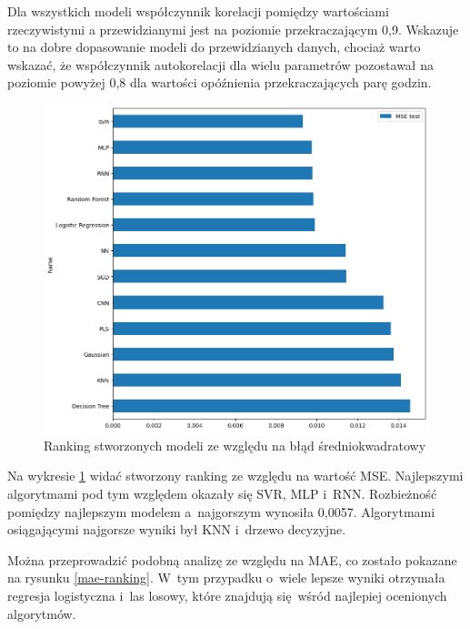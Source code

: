 Dla wszystkich modeli współczynnik korelacji pomiędzy wartościami rzeczywistymi 
a przewidzianymi jest na poziomie przekraczającym 0,9. Wskazuje to na dobre dopasowanie
modeli do przewidzianych danych, chociaż warto wskazać, że współczynnik
autokorelacji dla wielu parametrów pozostawał na poziomie powyżej 0,8 dla wartości
opóźnienia przekraczających parę godzin.

\begin{figure}[H]
    \centering
    \includegraphics[width=\textwidth]{images/mse_ranking.png}
    \caption{Ranking stworzonych modeli ze względu na błąd średniokwadratowy}
    \label{mse-ranking}
\end{figure}

Na wykresie \ref{mse-ranking} widać stworzony ranking ze względu na wartość MSE.
Najlepszymi algorytmami pod tym względem okazały się SVR, MLP i~RNN. Rozbieżność 
pomiędzy najlepszym modelem a~najgorszym wynosiła 0,0057. Algorytmami 
osiągającymi najgorsze wyniki był KNN i~drzewo decyzyjne.

Można przeprowadzić podobną analizę ze względu na MAE, co zostało pokazane na 
rysunku \ref{mae-ranking}. W~tym przypadku o~wiele lepsze wyniki 
otrzymała regresja logistyczna i~las losowy, które znajdują się wśród najlepiej 
ocenionych algorytmów.

